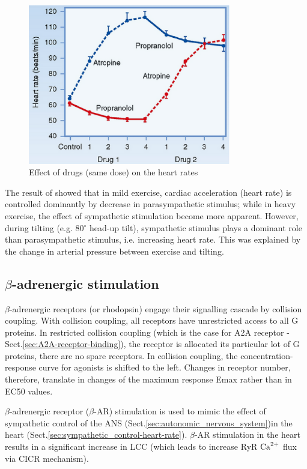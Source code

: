 \begin{figure}[hbtp]
  \centerline{\includegraphics[height=7cm,
    angle=0]{./images/heart_rate_drugs.eps}}
  \caption{Effect of drugs (same dose) on the heart rates}
  \label{fig:heart_rate_drugs}
\end{figure}

The result of \citep{Robinson1966} showed that in mild exercise, cardiac
acceleration (heart rate) is controlled dominantly by decrease in
parasympathetic stimulus; while in heavy exercise, the effect of sympathetic
stimulation become more apparent. However, during tilting (e.g. 80$^\circ$
head-up tilt), sympathetic stimulus plays a dominant role than parasympathetic
stimulus, i.e. increasing heart rate. This was explained by the change in
arterial pressure between exercise and tilting.


\subsection{\texorpdfstring{$\beta$-adrenergic stimulation}{beta-adrenergic
stimulation}}
\label{sec:beta-adrenergic_stimulation}

$\beta$-adrenergic receptors (or rhodopsin) engage their signalling cascade by
collision coupling. With collision coupling, all receptors have unrestricted
access to all G proteins. In restricted collision coupling (which is the case
for A2A receptor - Sect.\ref{sec:A2A-receptor-binding}), the receptor is
allocated its particular lot of G proteins, there are no spare receptors.
In collision coupling, the concentration-response curve for agonists is shifted
to the left. Changes in receptor number, therefore, translate in changes of the
maximum response Emax rather than in EC50 values.

$\beta$-adrenergic receptor ($\beta$-AR) stimulation is used to mimic the effect
of sympathetic control of the ANS (Sect.\ref{sec:autonomic_nervous_system})in
the heart (Sect.\ref{sec:sympathetic_control-heart-rate}). $\beta$-AR
stimulation in the heart results in a significant increase in LCC (which leads
to increase RyR ${\text{Ca}^{2+}}$ flux via CICR mechanism).

